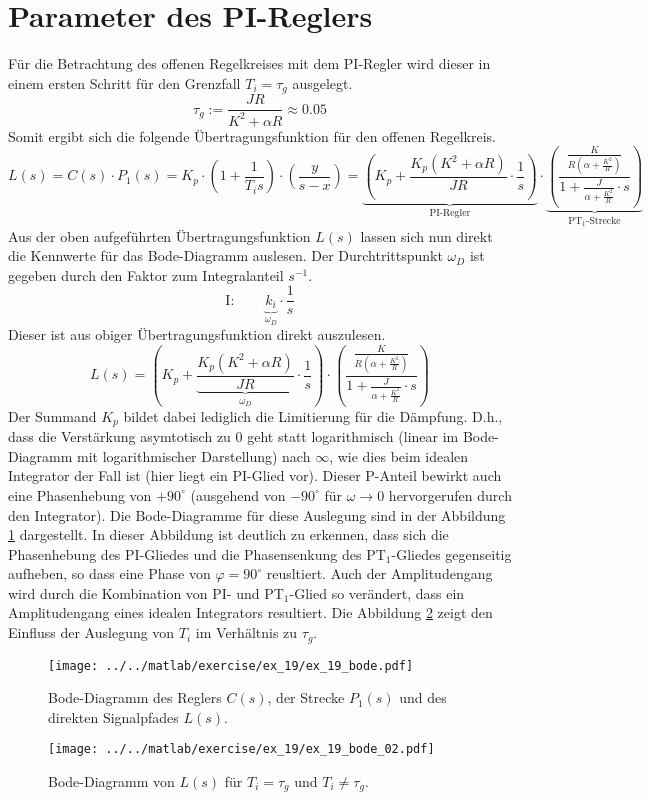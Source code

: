 \section{Parameter des PI-Reglers}
Für die Betrachtung des offenen Regelkreises mit dem PI-Regler wird dieser
in einem ersten Schritt für den Grenzfall $T_i = \tau_g$ ausgelegt.
\[
	\tau_g := \frac{J R}{K^2 + \alpha R} \approx 0.05 
\]
Somit ergibt sich die folgende Übertragungsfunktion für den offenen
Regelkreis.
\[
	L(s)
	= C(s) \cdot P_1(s)
	= K_p \cdot \left(
		1 + \frac{1}{T_i s}
	\right) \cdot \left(
		\frac{y}{s-x}
	\right)
	= \underbrace{\left(
		K_p + \frac{
			K_p \left(K^2 + \alpha R\right)
		}{JR} \cdot \frac{1}{s}
	\right)}_{\text{PI-Regler}} \cdot \underbrace{\left(
		\frac{
			\frac{K}{R \left(\alpha + \frac{K^2}{R}\right)}
		}{
			1 + \frac{J}{\alpha + \frac{K^2}{R}} \cdot s
		}
	\right)}_{\text{PT$_1$-Strecke}}
\]
Aus der oben aufgeführten Übertragungsfunktion $L(s)$ lassen sich nun
direkt die Kennwerte für das Bode-Diagramm auslesen. Der Durchtrittspunkt
$\omega_D$ ist gegeben durch den Faktor zum Integralanteil $s^{-1}$.
\[
	\text{I}: \qquad \underbrace{k_i}_{\omega_D} \cdot \frac{1}{s}
\]
Dieser ist aus obiger Übertragungsfunktion direkt auszulesen.
\[
	L(s) = \left(
		K_p + \underbrace{\frac{
			K_p \left(K^2 + \alpha R\right)}{JR}}_{\omega_D}
		\cdot \frac{1}{s}
	\right) \cdot \left(
		\frac{
			\frac{K}{R \left(\alpha + \frac{K^2}{R}\right)}
		}{
			1 + \frac{J}{\alpha + \frac{K^2}{R}} \cdot s
		}
	\right)
\]
Der Summand $K_p$ bildet dabei lediglich die Limitierung für die Dämpfung.
D.h., dass die Verstärkung asymtotisch zu 0 geht statt logarithmisch (linear
im Bode-Diagramm mit logarithmischer Darstellung) nach $\infty$, wie dies
beim idealen Integrator der Fall ist (hier liegt ein PI-Glied vor).
Dieser P-Anteil bewirkt auch eine Phasenhebung von $+90^{\circ}$ (ausgehend
von $-90^{\circ}$ für $\omega \rightarrow 0$ hervorgerufen durch den
Integrator). Die Bode-Diagramme für diese Auslegung sind in der Abbildung
\ref{fig:ex_19_bode_border} dargestellt. In dieser Abbildung ist deutlich
zu erkennen, dass sich die Phasenhebung des PI-Gliedes und die Phasensenkung
des PT$_1$-Gliedes gegenseitig aufheben, so dass eine Phase von
$\varphi = 90^{\circ}$ reusltiert. Auch der Amplitudengang wird durch die
Kombination von PI- und PT$_1$-Glied so verändert, dass ein Amplitudengang
eines idealen Integrators resultiert. Die Abbildung
\ref{fig:ex_19_bode_variants} zeigt den Einfluss der Auslegung von $T_i$
im Verhältnis zu $\tau_g$.

\begin{figure}[h!]
	\centering
	\texttt{[image: ../../matlab/exercise/ex\_19/ex\_19\_bode.pdf]}
	\caption{Bode-Diagramm des Reglers $C(s)$, der Strecke $P_1(s)$ und des
		direkten Signalpfades $L(s)$.}
	\label{fig:ex_19_bode_border}
\end{figure}

\begin{figure}[h!]
	\centering
	\texttt{[image: ../../matlab/exercise/ex\_19/ex\_19\_bode\_02.pdf]}
	\caption{Bode-Diagramm von $L(s)$ für $T_i = \tau_g$ und $T_i \neq \tau_g$.}
	\label{fig:ex_19_bode_variants}
\end{figure}
